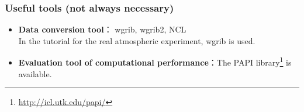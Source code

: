 \subsubsection{Useful tools (not always necessary)}
\begin{itemize}
  \item {\bf Data conversion tool}： wgrib, wgrib2, NCL\\
  In the tutorial for the real atmospheric experiment, wgrib is used.
  \item {\bf Evaluation tool of computational performance}：The PAPI library\footnote{\url{http://icl.utk.edu/papi/}} is available.
\end{itemize}

